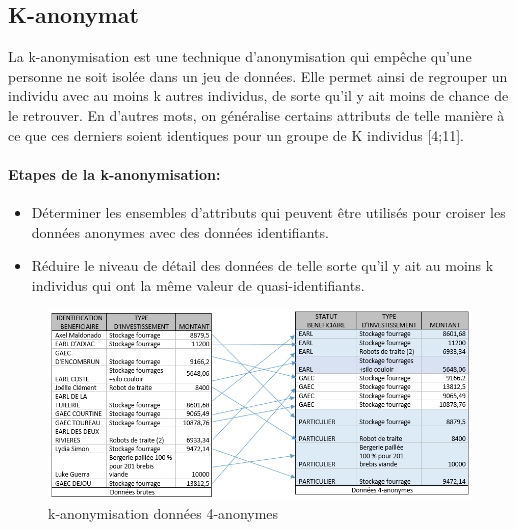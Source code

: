 \subsection{K-anonymat} 

La k-anonymisation est une technique d’anonymisation qui empêche qu’une personne ne soit isolée dans un jeu de données. Elle permet ainsi de regrouper un individu avec au moins k autres individus, de sorte qu’il y ait moins de chance de le retrouver. En d’autres mots, on généralise certains attributs de telle manière à ce que ces derniers soient identiques pour un groupe de K individus [4;11]. 

\paragraph{Etapes de la k-anonymisation:} 
\begin{itemize}
    \item  Déterminer les ensembles d’attributs qui peuvent être utilisés pour croiser les données anonymes avec des données identifiants. 

    \item Réduire le niveau de détail des données de telle sorte qu’il y ait au moins k individus qui ont la même valeur de quasi-identifiants. 
\end{itemize}

\begin{figure}
    \centering
     
    \includegraphics[width=1\textwidth]{images/anonymisation/k_anonym_image1.png}
    \caption{k-anonymisation données 4-anonymes}
    \label{k-anonymisation données 4-anonymes}
\end{figure}


